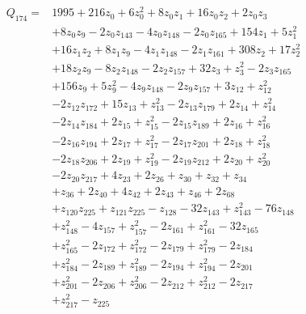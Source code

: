 \[\begin{aligned}Q_{174}={}&1995+216z_{0}+6z_{0}^{2}+8z_{0}z_{1}+16z_{0}z_{2}+2z_{0}z_{3}
\\&+8z_{0}z_{9}-2z_{0}z_{143}-4z_{0}z_{148}-2z_{0}z_{165}+154z_{1}+5z_{1}^{2}
\\&+16z_{1}z_{2}+8z_{1}z_{9}-4z_{1}z_{148}-2z_{1}z_{161}+308z_{2}+17z_{2}^{2}
\\&+18z_{2}z_{9}-8z_{2}z_{148}-2z_{2}z_{157}+32z_{3}+z_{3}^{2}-2z_{3}z_{165}
\\&+156z_{9}+5z_{9}^{2}-4z_{9}z_{148}-2z_{9}z_{157}+3z_{12}+z_{12}^{2}
\\&-2z_{12}z_{172}+15z_{13}+z_{13}^{2}-2z_{13}z_{179}+2z_{14}+z_{14}^{2}
\\&-2z_{14}z_{184}+2z_{15}+z_{15}^{2}-2z_{15}z_{189}+2z_{16}+z_{16}^{2}
\\&-2z_{16}z_{194}+2z_{17}+z_{17}^{2}-2z_{17}z_{201}+2z_{18}+z_{18}^{2}
\\&-2z_{18}z_{206}+2z_{19}+z_{19}^{2}-2z_{19}z_{212}+2z_{20}+z_{20}^{2}
\\&-2z_{20}z_{217}+4z_{23}+2z_{26}+z_{30}+z_{32}+z_{34}
\\&+z_{36}+2z_{40}+4z_{42}+2z_{43}+z_{46}+2z_{68}
\\&+z_{120}z_{225}+z_{121}z_{225}-z_{128}-32z_{143}+z_{143}^{2}-76z_{148}
\\&+z_{148}^{2}-4z_{157}+z_{157}^{2}-2z_{161}+z_{161}^{2}-32z_{165}
\\&+z_{165}^{2}-2z_{172}+z_{172}^{2}-2z_{179}+z_{179}^{2}-2z_{184}
\\&+z_{184}^{2}-2z_{189}+z_{189}^{2}-2z_{194}+z_{194}^{2}-2z_{201}
\\&+z_{201}^{2}-2z_{206}+z_{206}^{2}-2z_{212}+z_{212}^{2}-2z_{217}
\\&+z_{217}^{2}-z_{225}
\end{aligned}\]
\endgroup
